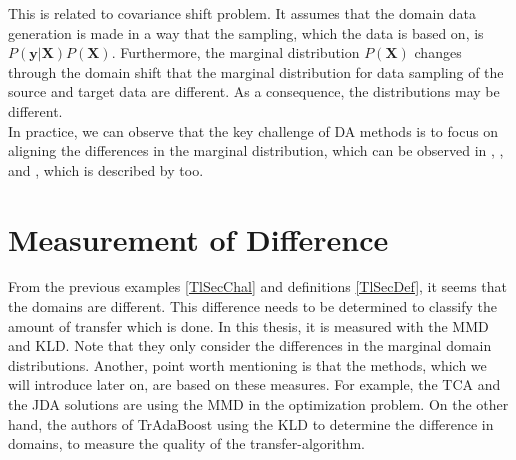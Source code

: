 This is related to covariance shift problem.\cite{Pan.2011}
It assumes that the domain data generation is made in a way that the sampling, which the data is based on, is $P(\mathbf{y}\vert \mathbf{X})P(\mathbf{X})$.
Furthermore, the marginal distribution $P(\mathbf{X})$ changes through the domain shift that the marginal distribution for data sampling of the source and target data are different. As a consequence, the distributions may be different.\cite[p. 8-9]{QuinoneroCandela.2009}\\
In practice, we can observe that the key challenge of \acl{DA} methods is to focus on aligning the differences in the marginal distribution, which can be observed in \cite{Pan.2011}, \cite{Long.}, \cite{Fernando.} and \cite{Arnold.2007}, which is described by \cite{Pan.2011} too.

\FloatBarrier
\section{Measurement of Difference}\label{TlSecMeasure}
From the previous examples \ref{TlSecChal} and definitions \ref{TlSecDef}, it seems that the domains are different.
This difference needs to be determined to classify the amount of transfer which is done.
In this thesis, it is measured with the \ac{MMD} and \ac{KLD}.
Note that they only consider the differences in the marginal domain distributions.
Another, point worth mentioning is that the methods, which we will introduce later on, are based on these measures.
For example, the \acl{TCA} and the \acl{JDA} solutions are using the \acs{MMD} in the optimization problem.
On the other hand, the authors of TrAdaBoost using the \acs{KLD} to determine the difference in domains, to measure the quality of the transfer-algorithm.

